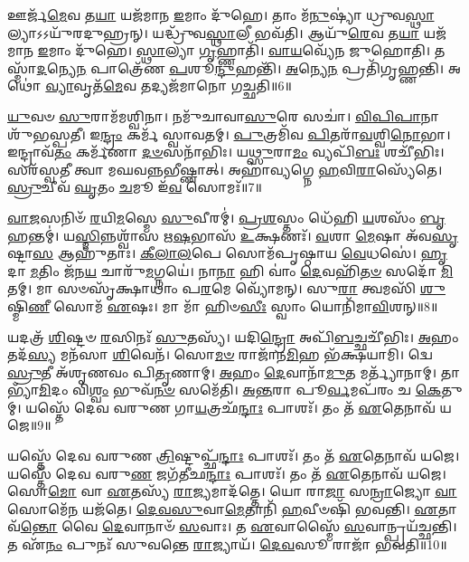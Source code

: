 𑌊𑌰𑍍𑌜᳴\-\ul{𑌮𑍇}\-𑌵 𑌤\-\ul{𑌯𑌾} 𑌯𑌜᳴𑌮𑌾𑌨 \ul{𑌇}\-𑌮𑌾𑌂 𑌦𑍁᳴𑌹𑍇।
𑌤𑌾𑌂 𑌮᳴\-\ul{𑌨𑍁}\-𑌷𑍍𑌯𑌾॑ 𑌧𑍍𑌰𑍁𑌵\-\ul{𑌸𑍍𑌥𑌾}\-𑌲𑍍𑌯𑌾\-𑌽𑌽𑌯𑍁᳴𑌰𑌦𑍁𑌹𑍍𑌰𑌨𑍍।
𑌯𑌦𑍍𑌧𑍍𑌰𑍁᳴𑌵\-\ul{𑌸𑍍𑌥𑌾}\-𑌲𑍀 𑌭𑌵᳴𑌤𑌿।
𑌆𑌯𑍁᳴\-\ul{𑌰𑍇}\-𑌵 𑌤\-\ul{𑌯𑌾} 𑌯𑌜᳴𑌮𑌾𑌨 \ul{𑌇}\-𑌮𑌾𑌂 𑌦𑍁᳴𑌹𑍇।
\-\ul{𑌸𑍍𑌥𑌾}\-𑌲𑍍𑌯𑌾 \ul{𑌗𑍃}\-𑌹𑍍𑌣𑌾𑌤𑌿᳴।
\-\ul{𑌵𑌾}\-\-\ul{𑌯}\-𑌵𑍍𑌯𑍇᳴𑌨 𑌜𑍁𑌹𑍋𑌤𑌿।
𑌤𑌸𑍍𑌮𑌾᳴\-\ul{𑌦}\-𑌨𑍍𑌯𑍇\-\ul{𑌨} 𑌪𑌾𑌤𑍍𑌰𑍇᳴𑌣 \ul{𑌪}\-𑌶𑍂\-\ul{𑌨𑍍𑌦𑍁}\-𑌹𑌨𑍍𑌤𑌿᳴।
\-\ul{𑌅}\-𑌨𑍍𑌯𑍇\-\ul{𑌨} 𑌪𑍍𑌰𑌤𑌿᳴\-𑌗𑍃𑌹𑍍𑌣𑌨𑍍𑌤𑌿।
𑌅𑌥𑍋॑ \ul{𑌵𑍍𑌯𑌾}\-𑌵𑍃𑌤᳴\-\ul{𑌮𑍇}\-𑌵 𑌤𑌦𑍍𑌯𑌜᳴𑌮𑌾𑌨𑍋 𑌗𑌚𑍍𑌛𑌤𑌿॥6॥\anuvakamend[\-\ul{𑌗𑍍𑌰}\-\-\ul{𑌹}\-𑌤𑍍𑌵𑌂 𑌗𑍍𑌰𑌹𑌾𑌂॑ \ul{𑌜𑍁}\-𑌹𑍋𑌤𑍍𑌯᳴𑌕𑍁𑌰𑍍𑌵𑌤𑌾𑌦𑍁𑌹𑍍𑌰𑌨𑍍𑌨𑌾𑌗𑍍𑌰𑌯𑌣\-\ul{𑌸𑍍𑌥𑌾}\-𑌲𑍀 𑌭𑌵᳴\-\ul{𑌤𑌿} 𑌨𑌵᳴ 𑌚]

\-\ul{𑌯𑍁}\-𑌵𑍞 \ul{𑌸𑍁}\-𑌰𑌾𑌮᳴𑌮𑌶𑍍𑌵𑌿𑌨𑌾।
𑌨𑌮𑍁᳴𑌚𑌾𑌵𑌾\-\ul{𑌸𑍁}\-𑌰𑍇 𑌸𑌚𑌾॑।
\-\ul{𑌵𑌿}\-\-\ul{𑌪𑌿}\-\-\ul{𑌪𑌾}\-𑌨𑌾 𑌶𑍁᳴𑌭𑌸𑍍𑌪𑌤𑍀।
𑌇\-\ul{𑌨𑍍𑌦𑍍𑌰𑌂} 𑌕𑌰𑍍𑌮᳴ 𑌸𑍍𑌵𑌾𑌵𑌤𑌮𑍍।
\-\ul{𑌪𑍁}\-𑌤𑍍𑌰𑌮𑌿᳴𑌵 \ul{𑌪𑌿}\-𑌤𑌰𑌾᳴\-\ul{𑌵}\-𑌶𑍍𑌵𑌿\-\ul{𑌨𑍋}\-𑌭𑌾।
𑌇𑌨𑍍𑌦𑍍𑌰𑌾𑌵᳴\-\ul{𑌤𑌂} 𑌕𑌰𑍍𑌮᳴𑌣𑌾 \ul{𑌦}\-\-\ul{𑍞}\-𑌸𑌨𑌾᳴𑌭𑌿𑌃।
𑌯\-\ul{𑌥𑍍𑌸𑍁}\-𑌰𑌾\-\ul{𑌮𑌂} 𑌵𑍍𑌯𑌪𑌿᳴\-\ul{𑌬𑌃} 𑌶𑌚𑍀᳴𑌭𑌿𑌃।
𑌸𑌰᳴𑌸𑍍𑌵𑌤𑍀 𑌤𑍍𑌵𑌾 𑌮𑌘𑌵𑌨𑍍𑌨𑌭𑍀𑌷𑍍𑌣𑌾𑌤𑍍।
𑌅𑌹𑌾॑𑌵𑍍𑌯𑌗𑍍𑌨𑍇 \ul{𑌹}\-𑌵𑌿\-\ul{𑌰𑌾}\-𑌸𑍍𑌯𑍇᳴𑌤𑍇।
\-\ul{𑌸𑍍𑌰𑍁}\-𑌚𑍀𑌵᳴ \ul{𑌘𑍃}\-𑌤𑌂 \ul{𑌚}\-𑌮𑍂 𑌇᳴\-\ul{𑌵} 𑌸𑍋𑌮𑌃᳴॥7॥

\-\ul{𑌵𑌾}\-\-\ul{𑌜}\-𑌸𑌨𑌿𑍞᳴ \ul{𑌰}\-𑌯𑌿\-\ul{𑌮}\-𑌸𑍍𑌮𑍇 \ul{𑌸𑍁}\-𑌵𑍀𑌰𑌮𑍍॑।
\-\ul{𑌪𑍍𑌰}\-\-\ul{𑌶}\-𑌸𑍍𑌤𑌂 𑌧𑍇᳴𑌹𑌿 \ul{𑌯}\-𑌶𑌸𑌂᳴ \ul{𑌬𑍃}\-𑌹𑌨𑍍𑌤𑌮𑍍॑।
𑌯\-\ul{𑌸𑍍𑌮𑌿}\-𑌨𑍍𑌨𑌶𑍍𑌵𑌾᳴𑌸 𑌋\-\ul{𑌷}\-𑌭𑌾𑌸᳴ \ul{𑌉}\-𑌕𑍍𑌷𑌣𑌃᳴।
\-\ul{𑌵}\-𑌶𑌾 \ul{𑌮𑍇}\-𑌷𑌾 𑌅᳴𑌵\-\ul{𑌸𑍃}\-𑌷𑍍𑌟𑌾\-\ul{𑌸} 𑌆𑌹𑍁᳴𑌤𑌾𑌃।
\-\ul{𑌕𑍀}\-\-\ul{𑌲𑌾}\-\-\ul{𑌲}\-𑌪𑍇 𑌸𑍋𑌮᳴𑌪𑍃𑌷𑍍𑌠𑌾𑌯 \ul{𑌵𑍇}\-𑌧𑌸𑍇॑।
\-\ul{𑌹𑍃}\-𑌦𑌾 \ul{𑌮}\-𑌤𑌿𑌂 𑌜᳴𑌨\-\ul{𑌯} 𑌚𑌾𑌰𑍁᳴\-\ul{𑌮}\-𑌗𑍍𑌨𑌯𑍇॑।
𑌨𑌾\-\ul{𑌨𑌾} 𑌹𑌿 𑌵𑌾𑌂॑ \ul{𑌦𑍇}\-𑌵𑌹𑌿᳴\-\ul{𑌤}\-\-\ul{𑍞} 𑌸𑌦𑍋᳴ \ul{𑌮𑌿}\-𑌤𑌮𑍍।
𑌮𑌾 𑌸𑍞𑌸𑍃᳴𑌕𑍍𑌷𑌾𑌥𑌾𑌂 𑌪\-\ul{𑌰}\-𑌮𑍇 𑌵𑍍𑌯𑍋᳴𑌮𑌨𑍍।
𑌸𑍁\-\ul{𑌰𑌾} 𑌤𑍍𑌵𑌮𑌸𑌿᳴ \ul{𑌶𑍁}\-𑌷𑍍𑌮𑌿\-\ul{𑌣𑍀} 𑌸𑍋𑌮᳴ \ul{𑌏}\-𑌷𑌃।
𑌮𑌾 𑌮𑌾᳴ 𑌹𑌿𑍞\-\ul{𑌸𑍀𑌃} 𑌸𑍍𑌵𑌾𑌂 𑌯𑍋𑌨𑌿᳴𑌮𑌾\-\ul{𑌵𑌿}\-𑌶𑌨𑍍॥8॥

𑌯𑌦𑌤𑍍𑌰᳴ \ul{𑌶𑌿}\-𑌷𑍍𑌟𑍞 \ul{𑌰}\-𑌸𑌿𑌨𑌃᳴ \ul{𑌸𑍁}\-𑌤𑌸𑍍𑌯᳴।
𑌯𑌦𑌿\-\ul{𑌨𑍍𑌦𑍍𑌰𑍋} 𑌅𑌪𑌿᳴\-\ul{𑌬}\-𑌚𑍍𑌛𑌚𑍀᳴𑌭𑌿𑌃।
\-\ul{𑌅}\-𑌹𑌂 𑌤𑌦᳴\-\ul{𑌸𑍍𑌯} 𑌮𑌨᳴𑌸𑌾 \ul{𑌶𑌿}\-𑌵𑍇𑌨᳴।
𑌸𑍋\-\ul{𑌮}\-\-\ul{𑍞} 𑌰𑌾𑌜𑌾᳴𑌨\-\ul{𑌮𑌿}\-𑌹 𑌭᳴𑌕𑍍𑌷𑌯𑌾𑌮𑌿।
𑌦𑍍𑌵𑍇 \ul{𑌸𑍍𑌰𑍁}\-𑌤𑍀 𑌅᳴𑌶𑍃𑌣𑌵𑌂 𑌪𑌿\-\ul{𑌤𑍃}\-𑌣𑌾𑌮𑍍।
\-\ul{𑌅}\-𑌹𑌂 \ul{𑌦𑍇}\-𑌵𑌾𑌨𑌾᳴\-\ul{𑌮𑍁}\-𑌤 𑌮𑌰𑍍𑌤𑍍𑌯𑌾᳴𑌨𑌾𑌮𑍍।
𑌤𑌾𑌭𑍍𑌯𑌾᳴\-\ul{𑌮𑌿}\-𑌦𑌂 𑌵𑌿\-\ul{𑌶𑍍𑌵𑌂} 𑌭𑍁𑌵᳴\-\ul{𑌨}\-\-\ul{𑍞} 𑌸𑌮𑍇᳴𑌤𑌿।
\-\ul{𑌅}\-\-\ul{𑌨𑍍𑌤}\-𑌰𑌾 𑌪𑍂\-\ul{𑌰𑍍𑌵}\-𑌮𑌪᳴𑌰𑌂 𑌚 \ul{𑌕𑍇}\-𑌤𑍁𑌮𑍍।
𑌯𑌸𑍍𑌤𑍇᳴ 𑌦𑍇𑌵 𑌵𑌰𑍁𑌣 𑌗𑌾\-\ul{𑌯}\-𑌤𑍍𑌰𑌛᳴\-\ul{𑌨𑍍𑌦𑌾𑌃} 𑌪𑌾𑌶𑌃᳴।
𑌤𑌂 𑌤᳴ \ul{𑌏}\-𑌤𑍇𑌨𑌾𑌵᳴ 𑌯𑌜𑍇॥9॥

𑌯𑌸𑍍𑌤𑍇᳴ 𑌦𑍇𑌵 𑌵𑌰𑍁𑌣 \ul{𑌤𑍍𑌰𑌿}\-𑌷𑍍𑌟𑍁𑌪𑍍𑌛᳴\-\ul{𑌨𑍍𑌦𑌾𑌃} 𑌪𑌾𑌶𑌃᳴।
𑌤𑌂 𑌤᳴ \ul{𑌏}\-𑌤𑍇𑌨𑌾𑌵᳴ 𑌯𑌜𑍇।
𑌯𑌸𑍍𑌤𑍇᳴ 𑌦𑍇𑌵 𑌵𑌰𑍁\-\ul{𑌣} 𑌜𑌗᳴𑌤𑍀𑌛\-\ul{𑌨𑍍𑌦𑌾𑌃} 𑌪𑌾𑌶𑌃᳴।
𑌤𑌂 𑌤᳴ \ul{𑌏}\-𑌤𑍇𑌨𑌾𑌵᳴ 𑌯𑌜𑍇।
𑌸𑍋\-\ul{𑌮𑍋} 𑌵𑌾 \ul{𑌏}\-𑌤𑌸𑍍𑌯᳴ \ul{𑌰𑌾}\-𑌜𑍍𑌯𑌮𑌾𑌦᳴𑌤𑍍𑌤𑍇।
𑌯𑍋 𑌰𑌾\-\ul{𑌜𑌾} 𑌸\-\ul{𑌨𑍍𑌰𑌾}\-𑌜𑍍𑌯𑍋 \ul{𑌵𑌾} 𑌸𑍋𑌮𑍇᳴\-\ul{𑌨} 𑌯𑌜᳴𑌤𑍇।
\-\ul{𑌦𑍇}\-\-\ul{𑌵}\-\-\ul{𑌸𑍁}\-𑌵𑌾\-\ul{𑌮𑍇}\-𑌤𑌾𑌨𑌿᳴ \ul{𑌹}\-𑌵𑍀𑍞𑌷𑌿᳴ 𑌭𑌵𑌨𑍍𑌤𑌿।
\-\ul{𑌏}\-𑌤𑌾𑌵᳴\-\ul{𑌨𑍍𑌤𑍋} 𑌵𑍈 \ul{𑌦𑍇}\-𑌵𑌾𑌨𑌾𑍞᳴ \ul{𑌸}\-𑌵𑌾𑌃।
𑌤 \ul{𑌏}\-𑌵𑌾𑌸𑍍𑌮𑍈᳴ \ul{𑌸}\-𑌵𑌾𑌨𑍍𑌪𑍍𑌰𑌯᳴𑌚𑍍𑌛𑌨𑍍𑌤𑌿।
𑌤 𑌏᳴\-\ul{𑌨𑌂} 𑌪𑍁𑌨𑌃᳴ 𑌸𑍁𑌵𑌨𑍍𑌤𑍇 \ul{𑌰𑌾}\-𑌜𑍍𑌯𑌾𑌯᳴।
\-\ul{𑌦𑍇}\-\-\ul{𑌵}\-𑌸𑍂 𑌰𑌾𑌜𑌾᳴ 𑌭𑌵𑌤𑌿॥10॥\anuvakamend[𑌸𑍋𑌮᳴ 𑌆\-\ul{𑌵𑌿}\-𑌶𑌨𑍍 𑌯᳴𑌜𑍇 \ul{𑌰𑌾}\-𑌜𑍍𑌯𑌾𑌯𑍈𑌕𑌂᳴ 𑌚]

